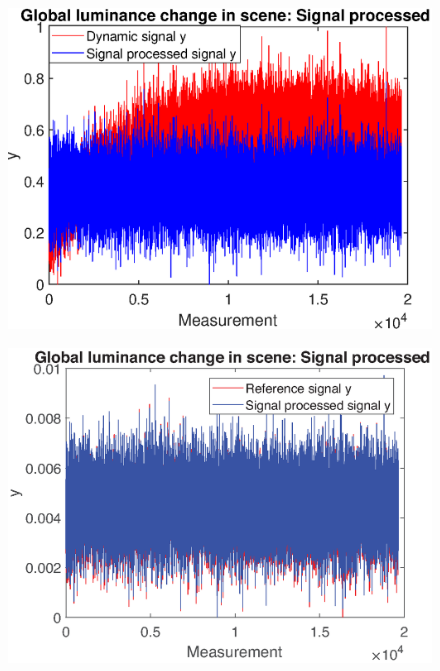 \begin{figure}[H]
    \centering
\begin{minipage}[t]{0.48\textwidth}
    \includegraphics[width = \textwidth]{result/dynamic/lum/intense_change_sp.eps}
    \label{fig:lum_sig_2}
\end{minipage}
\begin{minipage}[t]{0.51\textwidth}
    \includegraphics[width=1\textwidth]{result/dynamic/lum/intense_change_sp_ref1.eps}
    \label{fig:lum_sig_3}
\end{minipage}
\begin{minipage}[t]{0.50\textwidth}

\end{minipage}
\end{figure}
